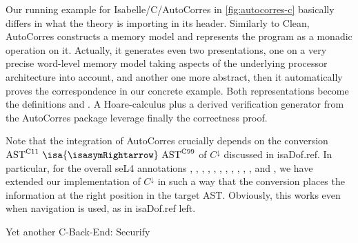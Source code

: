 \begin{isabellebody}
\begin{isamarkuptext}
\begin{figure}
\end{figure}
Our running example  for Isabelle/C/AutoCorres in \autoref{fig:autocorres-c} basically differs in what
the theory is importing in its header. Similarly to Clean, AutoCorres constructs a memory model and
represents the program as a monadic operation on it. Actually, it generates even two presentations,
one on a very precise word-level memory model taking aspects of the underlying processor
architecture into account, and another one more abstract, then it automatically proves the
correspondence in our concrete example. Both representations become the definitions
 and . A Hoare-calculus plus
a derived verification generator  from the AutoCorres package
leverage finally the correctness proof.%
\end{isamarkuptext}\isamarkuptrue%
%
\begin{isamarkuptext}%
Note that the integration of AutoCorres crucially depends on the conversion
$\text{AST}^\text{C11}~\isa{{\isasymRightarrow}}~\text{AST}^\text{C99}$ of $C^\downarrow$
discussed in \csname isaDof.ref. In particular, for the overall seL4
annotations
,
,
,
,
,
,
,
,
,
,
, and
,
we have extended our implementation of $C^\downarrow$ in such a way that the conversion places the
information at the right position in the target AST. Obviously, this works even when navigation is
used, as in \csname isaDof.ref left.%
\end{isamarkuptext}\isamarkuptrue%
%
\begin{isamarkupsubsection*}%
[label = {securify},type = {scholarly_paper.technical}, args={label = {securify},type = {scholarly_paper.technical}, scholarly_paper.text_section.main_author = {@{docitem ''fred''}}, Isa_COL.text_element.level = {}, Isa_COL.text_element.referentiable = {False}, Isa_COL.text_element.variants = {{STR ''outline'', STR ''document''}}, scholarly_paper.text_section.fixme_list = {}, Isa_COL.text_element.level = {}, scholarly_paper.technical.definition_list = {}}]Yet another C-Back-End: Securify%

\end{isamarkupsubsection*}
\end{isabellebody}
